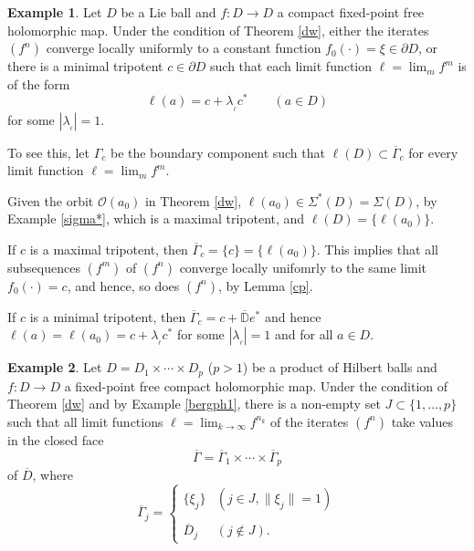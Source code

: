 \documentclass[12pt, twoside]{article}
\theoremstyle{definition}
\newtheorem*{xexam}{Example}
\numberwithin{equation}{section}
\begin{document}
\begin{xexam}
Let $D$ be a Lie ball and $f: D \longrightarrow D$ a compact fixed-point free holomorphic
map. Under the condition of Theorem \ref{dw}, either the iterates $(f^n)$ converge locally uniformly
to a constant function $f_0(\cdot) = \xi \in \partial D$, or there is a minimal tripotent $c\in \partial D$
such that each limit function  $\ell= \lim_m f^m$
is of the form
$$\ell(a) = c + \lambda_{_\ell} c^* \qquad ( a\in D)$$
for some $ |\lambda_{_\ell}|=1$.

To see this, let $\Gamma_c$ be the boundary component such that $\ell(D)\subset \overline \Gamma_c$
for every  limit function $\ell= \lim_m f^m$.

Given the orbit $\mathcal{O}(a_0)$ in Theorem \ref{dw},
$\ell(a_0) \in \Sigma^*(D) = \Sigma(D)$, by Example \ref{sigma*},
which is a maximal tripotent, and $\ell(D)= \{\ell(a_0)\}$.

 If $c$ is a maximal tripotent, then  $\overline\Gamma_c =\{c\} =\{\ell(a_0)\}$. This implies that all subsequences $(f^m)$
 of $(f^n)$ converge locally unifomrly to the same limit $f_0(\cdot)=c$, and hence, so does $(f^n)$, by Lemma \ref{cp}.

 If $c$ is a minimal tripotent, then $\overline\Gamma_c=c+ \overline{\mathbb{D}}e^*$
 and hence $\ell(a)=\ell (a_0)= c+ \lambda_{_\ell} c^*$ for some $|\lambda_{_\ell}|=1$ and  for all $a\in D$.
 \end{xexam}

\begin{xexam}
Let $D = D_1 \times \cdots
\times D_p$ ($p>1$) be a product of  Hilbert balls and $f: D \longrightarrow D$
a fixed-point free compact  holomorphic map. Under the condition of Theorem \ref{dw} and
by Example \ref{bergph1},  there is a non-empty set $ J \subset \{1, \ldots, p\}$
such that all limit functions $\displaystyle \ell = \lim_{k\rightarrow \infty} f^{n_k}$ of the iterates $(f^n)$
take  values
in the closed face
$$\overline\Gamma = \overline\Gamma_1 \times \cdots \times \overline\Gamma_p $$
of $\overline D$, where
\[\overline\Gamma_j = \left\{\begin{matrix} \{\xi_j\} & (j\in J, \|\xi_j\|=1)\\\\
                                                         \overline D_j & (j\notin J).
                                 \end{matrix}\right.
\]
\end{xexam}
\end{document}
